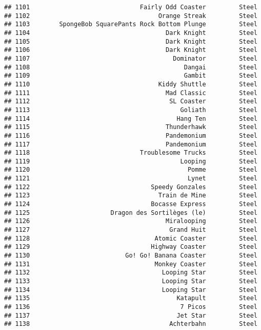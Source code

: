 \documentclass[
]{article}
\begin{document}
\begin{verbatim}
## 1101                              Fairly Odd Coaster         Steel
## 1102                                   Orange Streak         Steel
## 1103        SpongeBob SquarePants Rock Bottom Plunge         Steel
## 1104                                     Dark Knight         Steel
## 1105                                     Dark Knight         Steel
## 1106                                     Dark Knight         Steel
## 1107                                       Dominator         Steel
## 1108                                          Dangai         Steel
## 1109                                          Gambit         Steel
## 1110                                   Kiddy Shuttle         Steel
## 1111                                     Mad Classic         Steel
## 1112                                      SL Coaster         Steel
## 1113                                         Goliath         Steel
## 1114                                        Hang Ten         Steel
## 1115                                     Thunderhawk         Steel
## 1116                                     Pandemonium         Steel
## 1117                                     Pandemonium         Steel
## 1118                              Troublesome Trucks         Steel
## 1119                                         Looping         Steel
## 1120                                           Pomme         Steel
## 1121                                           Lynet         Steel
## 1122                                 Speedy Gonzales         Steel
## 1123                                   Train de Mine         Steel
## 1124                                 Bocasse Express         Steel
## 1125                      Dragon des Sortilèges (le)         Steel
## 1126                                     Miralooping         Steel
## 1127                                      Grand Huit         Steel
## 1128                                  Atomic Coaster         Steel
## 1129                                 Highway Coaster         Steel
## 1130                          Go! Go! Banana Coaster         Steel
## 1131                                  Monkey Coaster         Steel
## 1132                                    Looping Star         Steel
## 1133                                    Looping Star         Steel
## 1134                                    Looping Star         Steel
## 1135                                        Katapult         Steel
## 1136                                         7 Picos         Steel
## 1137                                        Jet Star         Steel
## 1138                                      Achterbahn         Steel

\end{verbatim}
\end{document}
